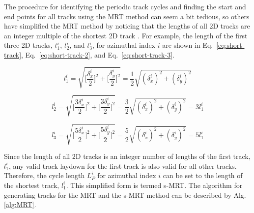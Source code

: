 The procedure for identifying the periodic track cycles and finding the start and end points for all tracks using the \ac{MRT} method can seem a bit tedious, so others have simplified the \ac{MRT} method by noticing that the lengths of all 2D tracks are an integer multiple of the shortest 2D track \cite{kochunas}. For example, the length of the first three 2D tracks, $t_1^i$, $t_2^i$, and $t_3^i$, for azimuthal index $i$ are shown in Eq.~\ref{eq:short-track}, Eq.~\ref{eq:short-track-2}, and Eq.~\ref{eq:short-track-3}.

\begin{equation}
l_1^i = \sqrt{\bigg[\frac{\delta_x^i}{2}\bigg]^2 + \bigg[\frac{\delta_y^i}{2}\bigg]^2} = \frac{1}{2} \sqrt{(\delta_x^i)^2 + (\delta_y^i)^2}
\label{eq:short-track}
\end{equation}

\begin{equation}
l_2^i = \sqrt{\bigg[\frac{3 \delta_x^i}{2}\bigg]^2 + \bigg[\frac{3 \delta_y^i}{2}\bigg]^2} = \frac{3}{2} \sqrt{(\delta_x^i)^2 + (\delta_y^i)^2} = 3 l_1^i
\label{eq:short-track-2}
\end{equation}

\begin{equation}
l_3^i = \sqrt{\bigg[\frac{5 \delta_x^i}{2}\bigg]^2 + \bigg[\frac{5 \delta_y^i}{2}\bigg]^2} = \frac{5}{2} \sqrt{(\delta_x^i)^2 + (\delta_y^i)^2} = 5 l_1^i
\label{eq:short-track-3}
\end{equation}

Since the length of all 2D tracks is an integer number of lengths of the first track, $l_1^i$, any valid track laydown for the first track is also valid for all other tracks. Therefore, the cycle length $L_P^i$ for azimuthal index $i$ can be set to the length of the shortest track, $l_1^i$. This simplified form is termed \ac{s-MRT}. The algorithm for generating tracks for the \ac{MRT} and the \ac{s-MRT} method can be described by Alg. \ref{alg:MRT}. 

